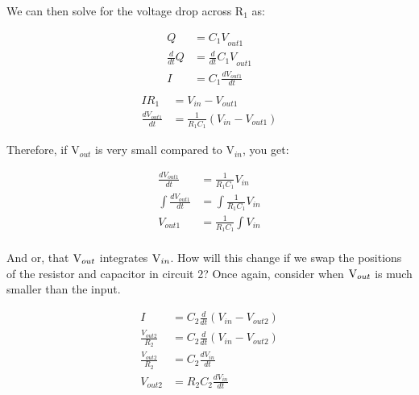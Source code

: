\documentclass[12pt]{report}
\newcommand{\pr}[1]{\left(#1\right)}
\newcommand{\V}{{\rm V}}
\begin{document}
We can then solve for the voltage drop across R$_1$ as: 

\begin{equation} \label{cap2}
\begin{split}
{Q} &= {C_1V}_{out1}\\
\frac{d}{dt}{Q} &= \frac{d}{dt}{C_1V}_{out1} \\
{I} &= {C_1}\frac{d{V}_{out1}}{dt} \\
\end{split}
\end{equation}
\begin{equation} \label{cap3}
\begin{split}
{IR}_1 &= V_{in} - V_{out1} \\
\frac{d{V}_{out1}}{dt} &= \frac{1}{{R}_1 C_1}\pr{V_{in} - V_{out1}}
\end{split}
\end{equation}\newline

Therefore, if V$_{out}$ is very small compared to V$_{in}$, you get: 

\begin{equation} \label{cap4}
\begin{split}
\frac{d{V}_{out1}}{dt} &= \frac{1}{{R}_1 C_1}V_{in}\\
\int \frac{d{V}_{out1}}{dt} &= \int \frac{1}{{R}_1 C_1}V_{in}\\
{V}_{out1} &= \frac{1}{{R}_1 C_1} \int V_{in}\\
\end{split}
\end{equation}

And or, that $\V_{out}$ integrates $\V_{in}$. How will this change if we swap the positions of the resistor and capacitor in circuit 2? Once again, consider when $\V_{out}$ is much smaller than the input. 

\begin{equation} \label{cap5}
\begin{split}
{I} &= {C_2}\frac{d}{dt} \pr{V_{in} - V_{out2}}\\
{\frac{V_{out2}}{R_2}} &= {C_2}\frac{d}{dt} \pr{V_{in} - V_{out2}}\\
{\frac{V_{out2}}{R_2}} &= {C_2}\frac{d V_{in}}{dt}\\
V_{out2} &= R_2{C_2}\frac{d V_{in}}{dt}\\
\end{split}
\end{equation}\newline
\end{document}
